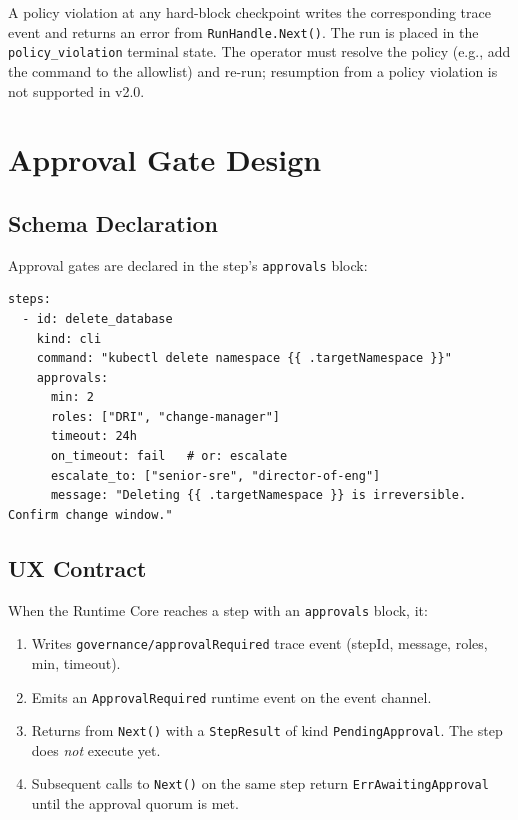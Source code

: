 A policy violation at any hard-block checkpoint writes the corresponding trace event and
returns an error from \texttt{RunHandle.Next()}. The run is placed in the
\texttt{policy\_violation} terminal state. The operator must resolve the policy
(e.g., add the command to the allowlist) and re-run; resumption from a policy violation
is not supported in v2.0.

\section{Approval Gate Design}
\label{sec:approval-gate}

\subsection{Schema Declaration}

Approval gates are declared in the step's \texttt{approvals} block:

\begin{verbatim}
steps:
  - id: delete_database
    kind: cli
    command: "kubectl delete namespace {{ .targetNamespace }}"
    approvals:
      min: 2
      roles: ["DRI", "change-manager"]
      timeout: 24h
      on_timeout: fail   # or: escalate
      escalate_to: ["senior-sre", "director-of-eng"]
      message: "Deleting {{ .targetNamespace }} is irreversible. Confirm change window."
\end{verbatim}

\subsection{UX Contract}

When the Runtime Core reaches a step with an \texttt{approvals} block, it:
\begin{enumerate}
  \item Writes \texttt{governance/approvalRequired} trace event (stepId, message, roles, min, timeout).
  \item Emits an \texttt{ApprovalRequired} runtime event on the event channel.
  \item Returns from \texttt{Next()} with a \texttt{StepResult} of kind \texttt{PendingApproval}.
        The step does \emph{not} execute yet.
  \item Subsequent calls to \texttt{Next()} on the same step return \texttt{ErrAwaitingApproval}
        until the approval quorum is met.
\end{enumerate}

